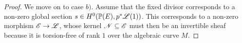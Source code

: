 \documentclass[A4paper, 12pt, british, reqno]{amsart}
\begin{document}
\begin{prop}
\begin{proof}
	We move on to case $b)$.
	Assume that the fixed divisor corresponds to a non-zero global section $s\in H^{0}(\mathbb{P}(E),p^{*}\mathscr{L}(1))$.
	This corresponds to a non-zero morphism $\mathscr{E}\to \mathscr{L}$, whose kernel $\mathscr{N}\subseteq \mathscr{E}$ must then be an invertible sheaf because it is torsion-free of rank $1$ over the algebraic curve $M$.
    \end{proof}
\end{prop}



\vspace{0.3cm}
\end{document}
